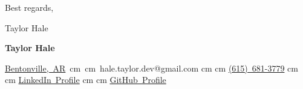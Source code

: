 \documentclass[10pt, letterpaper]{article}
\newenvironment{highlightsforbulletentries}{
    \begin{itemize}[
        topsep=0.10 cm,
        parsep=0.10 cm,
        partopsep=0pt,
        itemsep=0pt,
        leftmargin=10pt
    ]
}{
    \end{itemize}
} %
\newenvironment{onecolentry}{
    \begin{adjustwidth}{
        0.6 cm + 0.00001 cm
    }{
        0.6 cm + 0.00001 cm
    }
}{
    \end{adjustwidth}
} %
\newenvironment{header}{
    \setlength{\topsep}{0pt}\par\kern\topsep\centering\color{primaryColor}\linespread{1.5}
}{
    \par\kern\topsep
} %
\let\hrefWithoutArrow\href
\renewcommand{\href}[2]{\hrefWithoutArrow{#1}{\ifthenelse{\equal{#2}{}}{ }{#2 }\raisebox{.15ex}{\footnotesize \faExternalLink*}}}
\begin{document}
Best regards,
\bigskip %

Taylor Hale
\clearpage
    
    


    








    \begin{header}
        \fontsize{30 pt}{30 pt}
        \textbf{Taylor Hale}

        \vspace{0.3 cm}

        \normalsize
        \mbox{\hrefWithoutArrow{10776 AR-72, Bentonville, AR 72712}
        \mbox{{\footnotesize\faMapMarker*}\hspace*{0.13cm}Bentonville, AR}%
         cm%
        \AND%
         cm%
        {{\footnotesize\faEnvelope[regular]}\hspace*{0.13cm}hale.taylor.dev@gmail.com}}%
         cm%
        \AND%
         cm%
        \mbox{\hrefWithoutArrow{tel:615-681-3779}{{\footnotesize\faPhone*}\hspace*{0.13cm}(615) 681-3779}}%
         cm%
        \AND%
         cm%
        \mbox{\hrefWithoutArrow{https://linkedin.com/in/bits-for-bread}{{\footnotesize\faLinkedinIn}\hspace*{0.13cm}LinkedIn Profile}}%
         cm%
        \AND%
         cm%
        \mbox{\hrefWithoutArrow{https://github.com/Anjin-Byte}{{\footnotesize\faGithub}\hspace*{0.13cm}GitHub Profile}}%
    \end{header}
\end{document}
